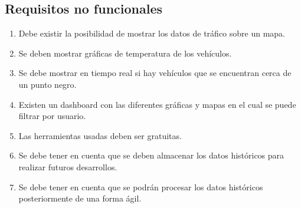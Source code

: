 \subsection{Requisitos no funcionales\label{RNF}}
\begin{enumerate}
        \item Debe existir la posibilidad de mostrar los datos de tráfico sobre un mapa.
        \item Se deben mostrar gráficas de temperatura de los vehículos.
        \item Se debe mostrar en tiempo real si hay vehículos que se encuentran cerca de un punto negro.
        \item Existen un dashboard con las diferentes gráficas y mapas en el cual se puede filtrar por usuario.
        \item Las herramientas usadas deben ser gratuitas.
        \item Se debe tener en cuenta que se deben almacenar los datos históricos para realizar futuros desarrollos.
        \item Se debe tener en cuenta que se podrán procesar los datos históricos posteriormente de una forma ágil.
\end{enumerate}

